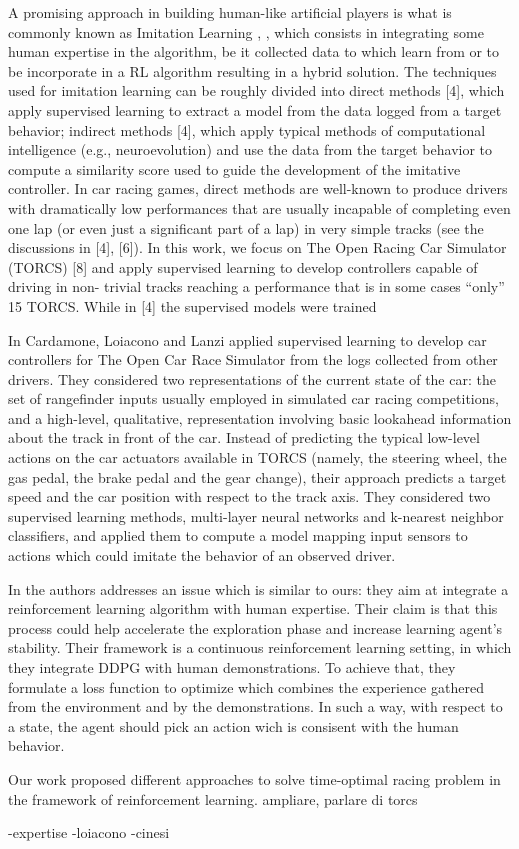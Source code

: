 A promising approach in building human-like artificial players is what is commonly known as Imitation Learning \cite{imit1}, \cite{imit2}, which consists in integrating some human expertise in the algorithm, be it collected data to which learn from or to be incorporate in a RL algorithm resulting in a hybrid solution.
The techniques used for imitation learning can be roughly divided into direct methods [4], which apply supervised learning to extract a
model from the data logged from a target behavior; indirect
methods [4], which apply typical methods of computational
intelligence (e.g., neuroevolution) and use the data from the
target behavior to compute a similarity score used to guide
the development of the imitative controller.
In car racing games, direct methods are well-known to
produce drivers with dramatically low performances that are
usually incapable of completing even one lap (or even just
a significant part of a lap) in very simple tracks (see the
discussions in [4], [6]). In this work, we focus on The Open
Racing Car Simulator (TORCS) [8] and apply supervised
learning to develop controllers capable of driving in non-
trivial tracks reaching a performance that is in some cases
“only” 15%
TORCS. While in [4] the supervised models were trained


In \cite{cardamone} Cardamone, Loiacono and Lanzi applied supervised learning to develop car controllers for The Open Car Race Simulator from the logs collected from other drivers. 
They considered two representations of the current state of the car: the set of rangefinder inputs usually employed in simulated car racing competitions, and a high-level, qualitative, representation involving basic lookahead information about the track in front of the car. Instead of predicting the typical low-level actions on the car actuators available in TORCS (namely, the steering wheel, the gas pedal, the brake pedal and the gear change), their approach predicts a target speed and the car position with respect to the track axis.
They considered two supervised learning methods, multi-layer neural networks and k-nearest neighbor classifiers, and applied them to compute a model mapping input sensors to actions which could imitate the behavior of an observed driver.

In \cite{cinesi} the authors addresses an issue which is similar to ours: they aim at integrate a reinforcement learning algorithm with human expertise. Their claim is that this process could help accelerate the exploration phase and increase learning agent's stability.
Their framework is a continuous reinforcement learning setting, in which they integrate DDPG with human demonstrations.
To achieve that, they formulate a loss function to optimize which combines the experience gathered from the environment and by the demonstrations. In such a way, with respect to a state, the agent should pick an action wich is consisent with the human behavior.

 Our work proposed different approaches to solve time-optimal racing problem in the framework of reinforcement learning. ampliare, parlare di torcs
 
 
 
 

-expertise
-loiacono
-cinesi